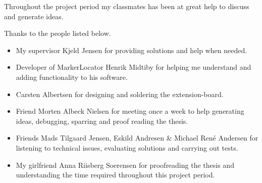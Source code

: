 Throughout the project period my classmates has been at great help to discuss and generate ideas.

Thanks to the people listed below.
\begin{itemize}
	\item My supervisor Kjeld Jensen for providing solutions and help when needed.
	\item Developer of MarkerLocator Henrik Midtiby for helping me understand and adding functionality to his software.
	\item Carsten Albertsen for designing and soldering the extension-board.
	\item Friend Morten Albeck Nielsen for meeting once a week to help generating ideas, debugging, sparring and proof reading the thesis.
	\item Friends Mads Tilgaard Jensen, Eskild Andresen \& Michael René Andersen for listening to technical issues, evaluating solutions and carrying out tests.
	\item My girlfriend Anna Riisberg Soerensen for proofreading the thesis and understanding the time required throughout this project period.
\end{itemize}
